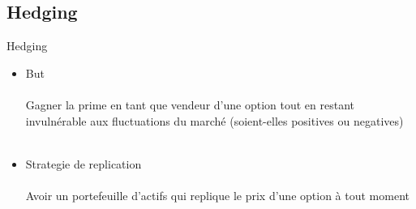 \documentclass[10pt]{beamer}
\begin{document}
\subsection{Hedging}

\begin{frame}{Hedging}{}
\begin{itemize}
\item But \\~\\
 Gagner la prime en tant que vendeur d'une option tout en restant invulnérable aux fluctuations du marché (soient-elles positives ou negatives) \\~\\
 
 \item Strategie de replication \\~\\
 Avoir un portefeuille d'actifs qui replique le prix d'une option à tout moment \\~\\
 \end{itemize}
 
 \end{frame}
 
\end{document}
